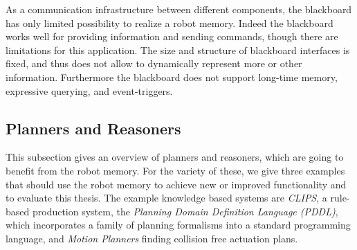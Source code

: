\documentclass[a4paper,11pt]{article}
\begin{document}
As a communication infrastructure between different components, the
blackboard has only limited possibility to realize a robot memory.
Indeed the blackboard works well for providing information and
sending commands, though there are limitations for this
application. The size and structure of blackboard interfaces is fixed, and
thus does not allow to dynamically represent more or other information.
Furthermore the blackboard does not support long-time memory,
expressive querying, and event-triggers.

\subsection{Planners and Reasoners}
\label{sec:planners}
This subsection gives an overview of planners and reasoners, which are
going to benefit from the robot memory. For the variety of these, we
give three examples that should use the robot memory to achieve new or
improved functionality and to evaluate this thesis. The example
knowledge based systems are \emph{CLIPS}, a rule-based production
system, the \emph{Planning Domain Definition Language (PDDL)}, which
incorporates a family of planning formalisms into a standard
programming language,
and \emph{Motion Planners} finding
collision free actuation plans.
\end{document}
